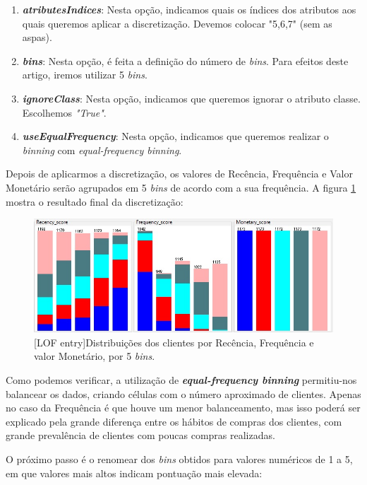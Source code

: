 \documentclass{easychair}
\begin{document}
\begin{enumerate}
    \item \textbf{\textit{atributesIndices}}: Nesta opção, indicamos quais os índices dos atributos aos quais queremos aplicar a discretização. Devemos colocar "5,6,7" (sem as aspas).
    \item \textbf{\textit{bins}}: Nesta opção, é feita a definição do número de \textit{bins}. Para efeitos deste artigo, iremos utilizar 5 \textit{bins}.
    \item \textbf{\textit{ignoreClass}}: Nesta opção, indicamos que queremos ignorar o atributo classe. Escolhemos \textit{"True"}.
    \item \textbf{\textit{useEqualFrequency}}: Nesta opção, indicamos que queremos realizar o \textit{binning} com \textit{equal-frequency binning}.
\end{enumerate}

Depois de aplicarmos a discretização, os valores de Recência, Frequência e Valor Monetário serão agrupados em 5 \textit{bins} de acordo com a sua frequência. A figura \ref{fig8} mostra o resultado final da discretização:

\begin{figure}[H]
    \begin{centering}
    \includegraphics[width=0.9\linewidth]{imagens/figure8.jpg}\label{cap-4-fig8}
    [LOF entry]{Distribuições dos clientes por Recência, Frequência e valor Monetário, por 5 \textit{bins}.}
    \label{fig8}
    \end{centering}
\end{figure}

Como podemos verificar, a utilização de \textit{\textbf{equal-frequency binning}} permitiu-nos balancear os dados, criando células com o número aproximado de clientes. Apenas no caso da Frequência é que houve um menor balanceamento, mas isso poderá ser explicado pela grande diferença entre os hábitos de compras dos clientes, com grande prevalência de clientes com poucas compras realizadas.

O próximo passo é o renomear dos \textit{bins} obtidos para valores numéricos de 1 a 5, em que valores mais altos indicam pontuação mais elevada:
\end{document}
